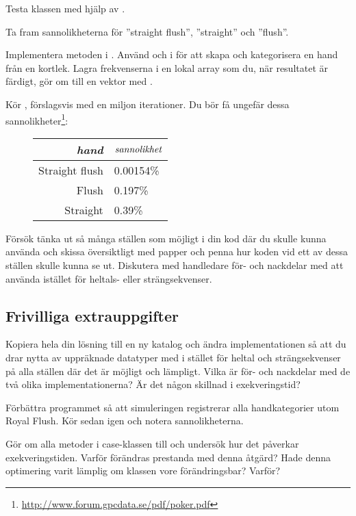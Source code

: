\Subtask Testa klassen  med hjälp av .


\Task Ta fram sannolikheterna för ''straight flush'', ''straight'' och ''flush''.

\Subtask Implementera metoden  i . Använd  och  i  för att skapa och kategorisera en hand från en kortlek. Lagra frekvenserna i en lokal array som du, när resultatet är färdigt, gör om till en vektor med .

\Subtask Kör , förslagsvis med en miljon iterationer. Du bör få ungefär dessa sannolikheter\footnote{\url{http://www.forum.gpcdata.se/pdf/poker.pdf}}:
\begin{figure}[H]\centering
\begin{tabular}{r|l}
\emph{hand} & $\emph{sannolikhet}$ \\ \hline
Straight flush & 0.00154\%  \\
Flush          & 0.197\%    \\
Straight       & 0.39\%     \\
\end{tabular}
\end{figure}

\Task Försök tänka ut så många ställen som möjligt i din kod där du skulle kunna använda  och skissa översiktligt med papper och penna hur koden vid ett av dessa ställen skulle kunna se ut. Diskutera med handledare för- och nackdelar med att använda  istället för heltals- eller strängsekvenser. 

\subsection{Frivilliga extrauppgifter}

\Task Kopiera hela din lösning till en ny katalog och ändra implementationen så att du drar nytta av uppräknade datatyper med  i stället för heltal och strängsekvenser på alla ställen där det är möjligt och lämpligt. Vilka är för- och nackdelar med de två olika implementationerna? Är det någon skillnad i exekveringstid?

\Task Förbättra programmet så att simuleringen registrerar alla handkategorier utom Royal Flush. Kör sedan  igen och notera sannolikheterna.

\Task Gör om alla metoder i case-klassen  till  och undersök hur det påverkar exekveringstiden. Varför förändras prestanda med denna åtgärd? Hade denna optimering varit lämplig om klassen  vore förändringsbar? Varför?

